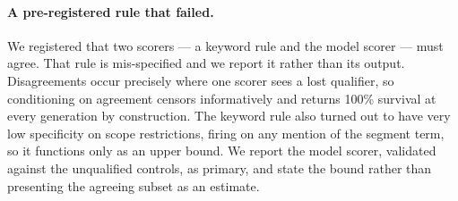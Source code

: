 \paragraph{A pre-registered rule that failed.} We registered that two scorers ---
a keyword rule and the model scorer --- must agree. That rule is mis-specified
and we report it rather than its output. Disagreements occur precisely where one
scorer sees a lost qualifier, so conditioning on agreement censors informatively
and returns 100\% survival at every generation by construction. The keyword rule
also turned out to have very low specificity on scope restrictions, firing on any
mention of the segment term, so it functions only as an upper bound. We report
the model scorer, validated against the unqualified controls, as primary, and
state the bound rather than presenting the agreeing subset as an estimate.
